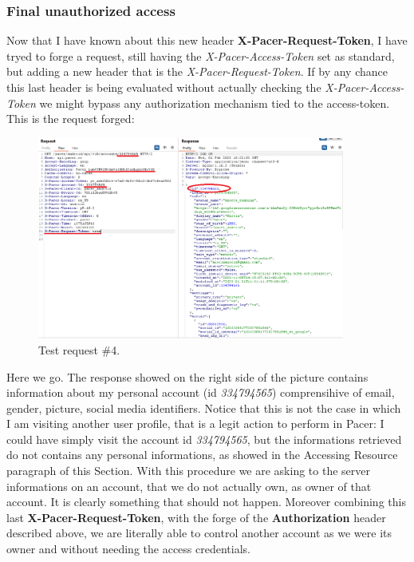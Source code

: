 		\subsubsection{Final unauthorized access }
			\par Now that I have known about this new header \textbf{X-Pacer-Request-Token}, I have tryed to forge a request, still having the \textit{X-Pacer-Access-Token} set as standard, but adding a new header that is the \textit{X-Pacer-Request-Token}. If by any chance this last header is being evaluated without actually checking the \textit{X-Pacer-Access-Token} we might bypass any authorization mechanism tied to the access-token. This is the request forged: 
			\begin{figure}[ht]
				\centering
				\includegraphics[width=0.9\textwidth]{images/pacer5.png}
				\caption{Test request \#4.}
			\end{figure}
			\par Here we go. The response showed on the right side of the picture contains information about my personal account (id \textit{334794565}) comprensihive of email, gender, picture, social media identifiers. Notice that this is not the case in which I am visiting another user profile, that is a legit action to perform in Pacer: I could have simply visit the account id \textit{334794565}, but the informations retrieved do not contains any personal informations, as showed in the Accessing Resource paragraph of this Section. With this procedure we are asking to the server informations on an account, that we do not actually own, as owner of that account. It is clearly something that should not happen.\newline
			Moreover combining this last \textbf{X-Pacer-Request-Token}, with the forge of the \textbf{Authorization} header described above, we are literally able to control another account as we were its owner and without needing the access credentials.
			
